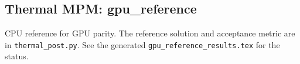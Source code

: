 \subsection{Thermal MPM: gpu\_reference}
CPU reference for GPU parity. The reference solution and acceptance metric are in \texttt{thermal\_post.py}. See the generated \texttt{gpu\_reference\_results.tex} for the status.
